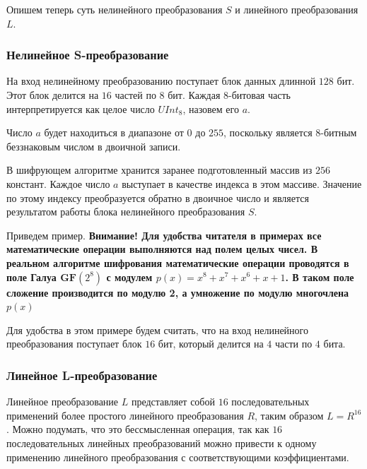\documentclass[a4paper, 12pt]{article}
\begin{document}
    Опишем теперь суть нелинейного преобразования $S$ и линейного 
    преобразования $L$.

    \subsubsection{Нелинейное S-преобразование}

    На вход нелинейному преобразованию поступает блок данных длинной $128$ бит. Этот блок
    делится на $16$ частей по $8$ бит. Каждая $8$-битовая часть интерпретируется как целое число $UInt_8$, назовем его $a$. 

    \begin{proposition} \label{propos:a_is_8_bit}
    Число $a$ будет находиться в диапазоне от $0$ до $255$, поскольку является $8$-битным 
    беззнаковым числом в двоичной записи.
    \end{proposition}

    В шифрующем алгоритме хранится заранее подготовленный массив из $256$ констант. Каждое
    число $a$ выступает в качестве индекса в этом массиве. Значение по этому индексу преобразуется обратно в двоичное 
    число и является результатом работы блока нелинейного преобразования $S$.

    Приведем пример. \textbf{Внимание! Для удобства читателя в примерах все математические операции выполняются над полем целых чисел. В реальном алгоритме шифрования математические операции проводятся в поле Галуа $\mathbf{GF}(2^8)$ с модулем $p(x) = x^8 + x^7 + x^6 + x + 1$. В таком поле сложение производится по модулю 2, а умножение по модулю многочлена $p(x)$}

    \begin{example}

    Для удобства в этом примере будем считать, что на вход нелинейного преобразования
    поступает блок $16$ бит, который делится на $4$ части по $4$ бита.
    
    \end{example}

    \subsubsection{Линейное L-преобразование}

    Линейное преобразование $L$ представляет собой $16$ последовательных применений более
    простого линейного преобразования $R$, таким образом $L = R^{16}$. Можно подумать,
    что это бессмысленная операция, так как $16$ последовательных линейных
    преобразований можно привести к одному применению линейного преобразования с 
    соответствующими коэффициентами.
\end{document}
